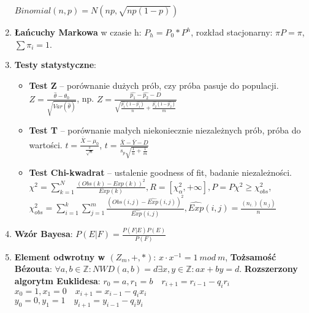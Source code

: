 \documentclass[12pt]{article}
\begin{document}
\begin{enumerate}
        $Binomial(n, p) = N\left(np, \sqrt{np(1-p)}\right)$

        \item \textbf{Łańcuchy Markowa} w czasie h:  $P_h = P_0 * P^h$, rozkład stacjonarny:
        $\pi P = \pi$, $\sum \pi_i = 1$.

        \item \textbf{Testy statystyczne}:
        \begin{itemize}[noitemsep]
            \item \textbf{Test Z} -- porównanie dużych prób, czy próba pasuje do populacji.
            $Z = \frac{\hat{\theta} - \theta_0}{\sqrt{Var(\hat{\theta})}}$, np.
            $Z = \frac{\hat{p_1} - \hat{p_2} - D}{\sqrt{\frac{\hat{p_1}(1-\hat{p_1})}{n} + \frac{\hat{p_2}(1-\hat{p_2})}{m}}}$

            \item \textbf{Test T} -- porównanie małych niekoniecznie niezależnych prób, próba do wartości.
            $t = \frac{\bar{X} - \mu_0}{\frac{s}{\sqrt{n}}}$,
            $t = \frac{\bar{X} - \bar{Y} - D}{s_p\sqrt{\frac{1}{n}+\frac{1}{m}}}$

            \item \textbf{Test Chi-kwadrat} -- ustalenie goodness of fit, badanie niezależności.
            $\chi^2 = \sum_{k=1}^{N} \frac{(Obs(k) - Exp(k))^2}{Exp(k)}, R = [\chi_{\alpha}^2, +\infty], P = P{\chi^2 \geq \chi_{obs}^2}$,\\
            $\chi_{obs}^2 = \sum_{i=1}^k \sum_{j=1}^m \frac{(Obs(i,j) - \hat{Exp}(i,j))^2}{\hat{Exp}(i,j)}, \hat{Exp}(i,j) = \frac{(n_{i.})(n_{.j})}{n}$
        \end{itemize}

        \item \textbf{Wzór Bayesa}: $   P(E|F) = \frac{P(F|E) P(E)}{P(F)}$

        \item  \textbf{Element odwrotny w $(Z_m, +, *)$}: $x \cdot x^{-1} = 1 \  mod \  m$,
        \textbf{Tożsamość Bézouta}: $\forall a, b \in \mathbb{Z} : NWD(a,b) = d \exists x, y \in \mathbb{Z}: ax + by = d$.
        \textbf{Rozszerzony algorytm Euklidesa}:
        $r_0 = a, r_1 = b \quad r_{i + 1} = r_{i - 1} - q_{i}r_{i}$\\
        $x_0 = 1, x_1 = 0 \quad x_{i + 1} = x_{i - 1} - q_{i}x_{i}$\\
        $y_0 = 0, y_1 = 1 \quad y_{i + 1} = y_{i - 1} - q_{i}y_{i}$


\end{enumerate}
\end{document}
